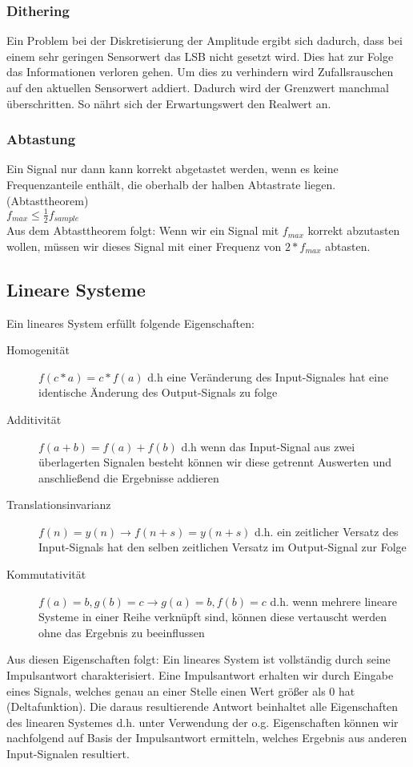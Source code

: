 \documentclass{article} %
\begin{document}
		\subsubsection{Dithering}
		Ein Problem bei der Diskretisierung der Amplitude ergibt sich dadurch, dass bei einem sehr geringen Sensorwert das LSB nicht gesetzt wird. Dies hat zur Folge das Informationen verloren gehen. Um dies zu verhindern wird Zufallsrauschen auf den aktuellen Sensorwert addiert. Dadurch wird der Grenzwert manchmal überschritten. So nährt sich der Erwartungswert den Realwert an.
		\subsubsection{Abtastung}

			Ein Signal nur dann kann korrekt abgetastet werden, wenn es keine
			Frequenzanteile enthält, die oberhalb der halben Abtastrate liegen. (Abtasttheorem)\\
			$f_{max} \leq \frac{1}{2}f_{sample}$\\
		Aus dem Abtasttheorem folgt: Wenn wir ein Signal mit $f_{max}$ korrekt abzutasten wollen, müssen wir dieses Signal mit einer Frequenz von $2*f_{max}$ abtasten. 
	\subsection{Lineare Systeme}
		Ein lineares System erfüllt folgende Eigenschaften:
		\begin{description}
			\item[Homogenität] $f(c*a) = c*f(a)$ d.h eine Veränderung des Input-Signales hat eine identische Änderung des Output-Signals zu folge
			\item[Additivität] $f(a+b) = f(a)+f(b)$ d.h wenn das Input-Signal aus zwei überlagerten Signalen besteht können wir diese getrennt Auswerten und anschließend die Ergebnisse addieren
			\item[Translationsinvarianz] $f(n) = y(n) \rightarrow f(n+s) = y(n+s)$ d.h. ein zeitlicher Versatz des Input-Signals hat den selben zeitlichen Versatz im Output-Signal zur Folge
			\item[Kommutativität] $f(a) = b, g(b) = c \rightarrow g(a)=b, f(b) = c$ d.h. wenn mehrere lineare Systeme in einer Reihe verknüpft sind, können diese vertauscht werden ohne das Ergebnis zu beeinflussen
		\end{description}
		Aus diesen Eigenschaften folgt: Ein lineares System ist vollständig durch seine Impulsantwort charakterisiert. Eine Impulsantwort erhalten wir durch Eingabe eines Signals, welches genau an einer Stelle einen Wert größer als 0 hat (Deltafunktion). Die daraus resultierende Antwort beinhaltet alle Eigenschaften des linearen Systemes d.h. unter Verwendung der o.g. Eigenschaften können wir nachfolgend auf Basis der Impulsantwort ermitteln, welches Ergebnis aus anderen Input-Signalen resultiert.
\end{document}
